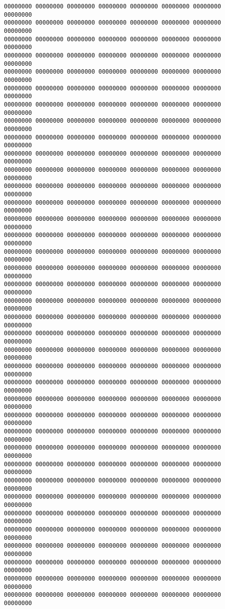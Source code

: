 \documentclass[12pt,]{book}
\begin{document}
\begin{lstlisting}
00000000 00000000 00000000 00000000 00000000 00000000 00000000 00000000
00000000 00000000 00000000 00000000 00000000 00000000 00000000 00000000
00000000 00000000 00000000 00000000 00000000 00000000 00000000 00000000
00000000 00000000 00000000 00000000 00000000 00000000 00000000 00000000
00000000 00000000 00000000 00000000 00000000 00000000 00000000 00000000
00000000 00000000 00000000 00000000 00000000 00000000 00000000 00000000
00000000 00000000 00000000 00000000 00000000 00000000 00000000 00000000
00000000 00000000 00000000 00000000 00000000 00000000 00000000 00000000
00000000 00000000 00000000 00000000 00000000 00000000 00000000 00000000
00000000 00000000 00000000 00000000 00000000 00000000 00000000 00000000
00000000 00000000 00000000 00000000 00000000 00000000 00000000 00000000
00000000 00000000 00000000 00000000 00000000 00000000 00000000 00000000
00000000 00000000 00000000 00000000 00000000 00000000 00000000 00000000
00000000 00000000 00000000 00000000 00000000 00000000 00000000 00000000
00000000 00000000 00000000 00000000 00000000 00000000 00000000 00000000
00000000 00000000 00000000 00000000 00000000 00000000 00000000 00000000
00000000 00000000 00000000 00000000 00000000 00000000 00000000 00000000
00000000 00000000 00000000 00000000 00000000 00000000 00000000 00000000
00000000 00000000 00000000 00000000 00000000 00000000 00000000 00000000
00000000 00000000 00000000 00000000 00000000 00000000 00000000 00000000
00000000 00000000 00000000 00000000 00000000 00000000 00000000 00000000
00000000 00000000 00000000 00000000 00000000 00000000 00000000 00000000
00000000 00000000 00000000 00000000 00000000 00000000 00000000 00000000
00000000 00000000 00000000 00000000 00000000 00000000 00000000 00000000
00000000 00000000 00000000 00000000 00000000 00000000 00000000 00000000
00000000 00000000 00000000 00000000 00000000 00000000 00000000 00000000
00000000 00000000 00000000 00000000 00000000 00000000 00000000 00000000
00000000 00000000 00000000 00000000 00000000 00000000 00000000 00000000
00000000 00000000 00000000 00000000 00000000 00000000 00000000 00000000
00000000 00000000 00000000 00000000 00000000 00000000 00000000 00000000
00000000 00000000 00000000 00000000 00000000 00000000 00000000 00000000
00000000 00000000 00000000 00000000 00000000 00000000 00000000 00000000
00000000 00000000 00000000 00000000 00000000 00000000 00000000 00000000
00000000 00000000 00000000 00000000 00000000 00000000 00000000 00000000
00000000 00000000 00000000 00000000 00000000 00000000 00000000 00000000
00000000 00000000 00000000 00000000 00000000 00000000 00000000 00000000
00000000 00000000 00000000 00000000 00000000 00000000 00000000 00000000

\end{lstlisting}
\end{document}

